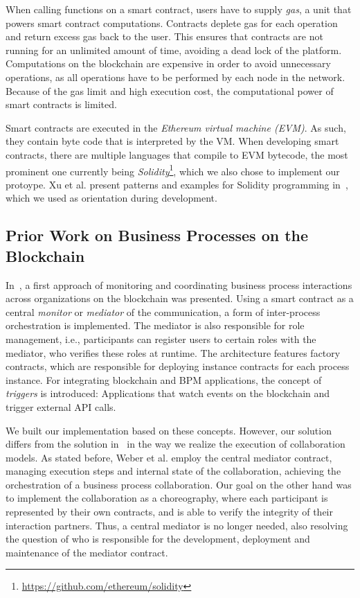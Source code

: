 \documentclass[runningheads]{llncs}
\begin{document}
When calling functions on a smart contract, users have to supply \emph{gas}, a unit that powers smart contract computations.
Contracts deplete gas for each operation and return excess gas back to the user.
This ensures that contracts are not running for an unlimited amount of time, avoiding a dead lock of the platform.
Computations on the blockchain are expensive in order to avoid unnecessary operations, as all operations have to be performed by each node in the network.
Because of the gas limit and high execution cost, the computational power of smart contracts is limited.

Smart contracts are executed in the \emph{Ethereum virtual machine (EVM)}.
As such, they contain byte code that is interpreted by the VM.
When developing smart contracts, there are multiple languages that compile to EVM bytecode, the most prominent one currently being \emph{Solidity}\footnote{\url{https://github.com/ethereum/solidity}}, which we also chose to implement our protoype.
Xu et al. present patterns and examples for Solidity programming in~\cite{xu2018pattern}, which we used as orientation during development.

\subsection{Prior Work on Business Processes on the Blockchain}
In~\cite{weber2016untrusted}, a first approach of monitoring and coordinating business process interactions across organizations on the blockchain was presented.
Using a smart contract as a central \emph{monitor} or \emph{mediator} of the communication, a form of inter-process orchestration is implemented.
The mediator is also responsible for role management, i.e., participants can register users to certain roles with the mediator, who verifies these roles at runtime.
The architecture features factory contracts, which are responsible for deploying instance contracts for each process instance.
For integrating blockchain and BPM applications, the concept of \emph{triggers} is introduced: Applications that watch events on the blockchain and trigger external API calls.

We built our implementation based on these concepts.
However, our solution differs from the solution in~\cite{weber2016untrusted} in the way we realize the execution of collaboration models.
As stated before, Weber et al. employ the central mediator contract, managing execution steps and internal state of the collaboration, achieving the orchestration of a business process collaboration.
Our goal on the other hand was to implement the collaboration as a choreography, where each participant is represented by their own contracts, and is able to verify the integrity of their interaction partners.
Thus, a central mediator is no longer needed, also resolving the question of who is responsible for the development, deployment and maintenance of the mediator contract.
\end{document}
